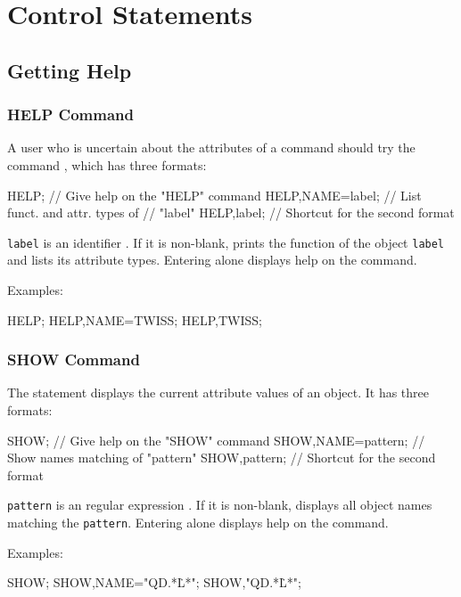

\chapter{Control Statements}
\label{chp:control}

\section{Getting Help}

\subsection{HELP Command}
\label{sec:help}
A user who is uncertain about the attributes of a command
should try the command , which has three formats:
\begin{example}
HELP;                 // Give help on the "HELP" command
HELP,NAME=label;      // List funct. and attr. types of
                      // "label"
HELP,label;           // Shortcut for the second format
\end{example}
\texttt{label} is an {identifier} .
If it is non-blank,
\opal prints the function of the object \texttt{label} and lists its
attribute types.
Entering  alone displays help on the 
command.

\noindent Examples:
\begin{example}
HELP;
HELP,NAME=TWISS;
HELP,TWISS;
\end{example}

\subsection{SHOW Command}
\label{sec:show}
The  statement displays the current attribute values
of an object.
It has three formats:
\begin{example}
SHOW;                 // Give help on the "SHOW" command
SHOW,NAME=pattern;    // Show names matching of "pattern"
SHOW,pattern;         // Shortcut for the second format
\end{example}
\texttt{pattern} is an {regular expression} .
If it is non-blank,
\opal displays all object names matching the \texttt{pattern}.
Entering  alone displays help on the 
command.

\noindent Examples:
\begin{example}
SHOW;
SHOW,NAME="QD.*\.L*";
SHOW,"QD.*\.L*";
\end{example}

